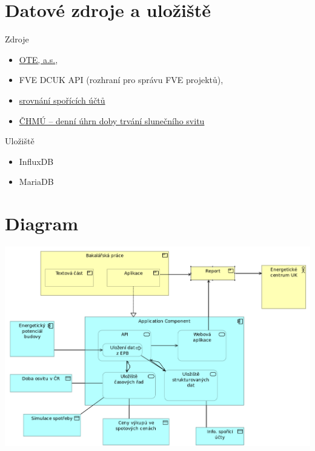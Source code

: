 \documentclass[12pt, aspectratio=169]{beamer} %
\begin{document}
\section{Datové zdroje a uložiště}

\begin{frame}{\insertsection}
    \begin{block}{Zdroje}
        \begin{itemize}
            \item \href{https://www.ote-cr.cz/}{OTE, a.s.},
            \item FVE DCUK API (rozhraní pro správu FVE projektů),
            \item \href{https://www.mesec.cz/produkty/sporici-ucty/}{srovnání spořících účtů}
            \item \href{https://www.chmi.cz/historicka-data/pocasi/denni-data/Denni-data-dle-z.-123-1998-Sb}{ČHMÚ -- denní úhrn doby trvání slunečního svitu}
        \end{itemize}        
    \end{block}
    \begin{block}{Uložiště}
        \begin{itemize}
            \item InfluxDB
            \item MariaDB
        \end{itemize}
    \end{block}
\end{frame}

\section{Diagram}

\begin{frame}[standout]
    \centering
    \includegraphics[height=1.1\textheight]{diagram.png}
\end{frame}
\end{document}
